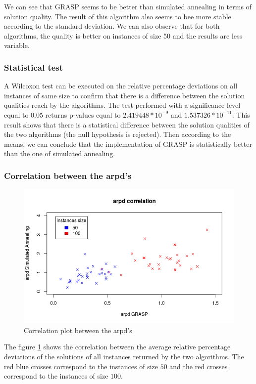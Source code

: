 \documentclass{article}
\begin{document}
We can see that GRASP seems to be better than simulated annealing in terms of solution quality.
The result of this algorithm also seems to bee more stable according to the standard deviation.
We can also observe that for both algorithms, the quality is better on instances of size 50 and the results are less variable.

\subsubsection{Statistical test}

A Wilcoxon test can be executed on the relative percentage deviations on all instances of same size to confirm that there is a difference between the solution qualities reach by the algorithms.
The test performed with a significance level equal to $0.05$ returns p-values equal to $2.419448*10^{-9}$ and $1.537326*10^{-11}$.
This result shows that there is a statistical difference between the solution qualities of the two algorithms (the null hypothesis is rejected).
Then according to the means, we can conclude that the implementation of GRASP is statistically better than the one of simulated annealing.

\subsubsection{Correlation between the arpd's}

\begin{figure}
    \centering
        \includegraphics[scale=0.5]{images/correlation}
    \caption{Correlation plot between the arpd's}
    \label{fig:corr}
\end{figure}

The figure \ref{fig:corr} shows the correlation between the average relative percentage deviations of the solutions of all instances returned by the two algorithms.
The red blue crosses correspond to the instances of size $50$ and the red crosses correspond to the instances of size $100$.
\end{document}
